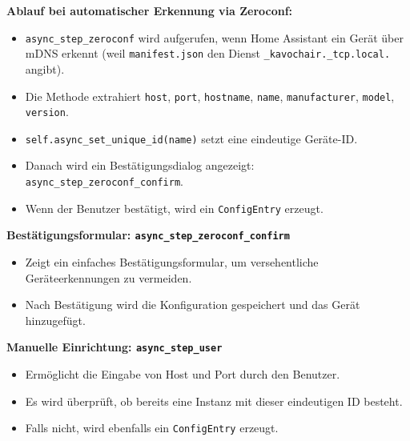 \vspace{0.5cm}

\textbf{Ablauf bei automatischer Erkennung via Zeroconf:}

\begin{itemize}
\item \texttt{async\_step\_zeroconf} wird aufgerufen, wenn Home Assistant ein Gerät über mDNS erkennt (weil \texttt{manifest.json} den Dienst \texttt{\_kavochair.\_tcp.local.} angibt).
\item Die Methode extrahiert \texttt{host}, \texttt{port}, \texttt{hostname}, \texttt{name}, \texttt{manufacturer}, \texttt{model}, \texttt{version}.
\item \texttt{self.async\_set\_unique\_id(name)} setzt eine eindeutige Geräte-ID.
\item Danach wird ein Bestätigungsdialog angezeigt: \texttt{async\_step\_zeroconf\_confirm}.
\item Wenn der Benutzer bestätigt, wird ein \texttt{ConfigEntry} erzeugt.
\end{itemize}

\vspace{0.5cm}

\textbf{Bestätigungsformular: \texttt{async\_step\_zeroconf\_confirm}}

\begin{itemize}
\item Zeigt ein einfaches Bestätigungsformular, um versehentliche Geräteerkennungen zu vermeiden.\\
\item Nach Bestätigung wird die Konfiguration gespeichert und das Gerät hinzugefügt.
\end{itemize}

\vspace{0.5cm}

\textbf{Manuelle Einrichtung: \texttt{async\_step\_user}}

\begin{itemize}
\item Ermöglicht die Eingabe von Host und Port durch den Benutzer.\\
\item Es wird überprüft, ob bereits eine Instanz mit dieser eindeutigen ID besteht.\\
\item Falls nicht, wird ebenfalls ein \texttt{ConfigEntry} erzeugt.\\
\end{itemize}

